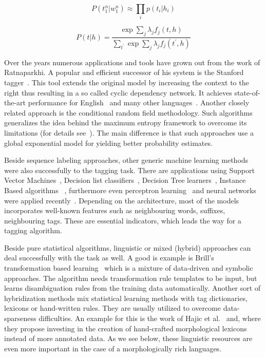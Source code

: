 \begin{equation}
P(t_1^n | w_1^n) \approx \prod_i p(t_i|h_i)
\end{equation}

\begin{equation}
P(t|h) = \frac{\exp{\sum_j{\lambda_j f_j(t,h)}}}{\sum_{t^\prime}\exp{\sum_j{\lambda_j f_j(t^\prime,h)}}}
\end{equation}

Over the years numerous applications and tools have grown out from the work of Ratnaparkhi.
A popular and efficient successor of his system is the Stanford tagger~\cite{}.
This tool extends the original model by increasing the context to the right thus resulting in a so called cyclic dependency network.
It achieves state-of-the-art performance for English~\cite{} and many other languages~\cite{}.
Another closely related approach is the conditional random field methodology.
Such algorithms generalizes the idea behind the maximum entropy framework to overcome its limitations (for details see~\cite{}).
The main difference is that such approaches use a global exponential model for yielding better probability estimates.

Beside sequence labeling approaches, other generic machine learning methods were also successfully to the tagging task.
There are applications using Support Vector Machines~\cite{SVMTAgger}, Decision list classifiers~\cite{}, Decision Tree learners~\cite{lengyel}, Instance Based algorithms~\cite{lengyel,...} , furthermore even perceptron learning~\cite{lengyel,collins} and neural networks were applied recently~\cite{from_scratch,Collins}.
Depending on the architecture, most of the models incorporates well-known features such as neighbouring words, suffixes, neighbouring tags.
These are essential indicators, which leads the way for a tagging algorithm.

Beside pure statistical algorithms, linguistic or mixed (hybrid) approaches can deal successfully with the task as well.
A good is example is Brill’s transformation based learning~\cite{} which is a mixture of data-driven and symbolic approaches.
The algorithm needs transformation rule templates to be input, but learns disambiguation rules from the training data automatically.
Another sort of hybridization methods mix statistical learning methods with tag dictionaries, lexicons or hand-written rules.
They are usually utilized to overcome data-sparseness difficulties.
An example for this is the work of Hajic et al.~\cite{} and, where they propose investing in the creation of hand-crafted morphological lexicons instead of more annotated data.
As we see below, these linguistic resources are even more important in the case of a morphologically rich languages.


